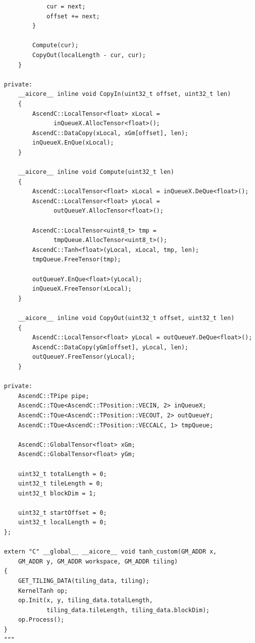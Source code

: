\documentclass{article} %
\theoremstyle{definition}
\theoremstyle{remark}
\begin{document}
\begin{tcolorbox}[colback=red!5, colframe=red!30, boxrule=0.3pt, arc=0pt, left=2pt, right=2pt, top=0pt, bottom=0pt, breakable, nobeforeafter]
\begin{verbatim}
            cur = next;
            offset += next;
        }

        Compute(cur);
        CopyOut(localLength - cur, cur);
    }

private:
    __aicore__ inline void CopyIn(uint32_t offset, uint32_t len)
    {
        AscendC::LocalTensor<float> xLocal = 
              inQueueX.AllocTensor<float>();
        AscendC::DataCopy(xLocal, xGm[offset], len);
        inQueueX.EnQue(xLocal);
    }

    __aicore__ inline void Compute(uint32_t len)
    {
        AscendC::LocalTensor<float> xLocal = inQueueX.DeQue<float>();
        AscendC::LocalTensor<float> yLocal = 
              outQueueY.AllocTensor<float>();

        AscendC::LocalTensor<uint8_t> tmp = 
              tmpQueue.AllocTensor<uint8_t>();
        AscendC::Tanh<float>(yLocal, xLocal, tmp, len);
        tmpQueue.FreeTensor(tmp);

        outQueueY.EnQue<float>(yLocal);
        inQueueX.FreeTensor(xLocal);
    }

    __aicore__ inline void CopyOut(uint32_t offset, uint32_t len)
    {
        AscendC::LocalTensor<float> yLocal = outQueueY.DeQue<float>();
        AscendC::DataCopy(yGm[offset], yLocal, len);
        outQueueY.FreeTensor(yLocal);
    }

private:
    AscendC::TPipe pipe;
    AscendC::TQue<AscendC::TPosition::VECIN, 2> inQueueX;
    AscendC::TQue<AscendC::TPosition::VECOUT, 2> outQueueY;
    AscendC::TQue<AscendC::TPosition::VECCALC, 1> tmpQueue;

    AscendC::GlobalTensor<float> xGm;
    AscendC::GlobalTensor<float> yGm;

    uint32_t totalLength = 0;
    uint32_t tileLength = 0;
    uint32_t blockDim = 1;

    uint32_t startOffset = 0;
    uint32_t localLength = 0;
};

extern "C" __global__ __aicore__ void tanh_custom(GM_ADDR x, 
    GM_ADDR y, GM_ADDR workspace, GM_ADDR tiling)
{
    GET_TILING_DATA(tiling_data, tiling);
    KernelTanh op;
    op.Init(x, y, tiling_data.totalLength, 
            tiling_data.tileLength, tiling_data.blockDim);
    op.Process();
}
"""
  \end{verbatim}
  \end{tcolorbox}
\end{document}
